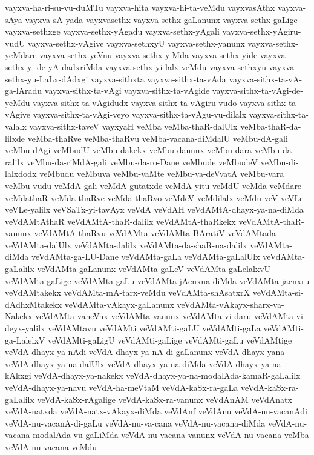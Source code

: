 {vayxva-ha-ri-su-vu-duMTu
vayxva-hita
vayxva-hi-ta-veMdu
vayxvasAthx
vayxva-sAya
vayxva-sA-yada
vayxvasethx
vayxva-sethx-gaLanunx
vayxva-sethx-gaLige
vayxva-sethxge
vayxva-sethx-yAgadu
vayxva-sethx-yAgali
vayxva-sethx-yAgiru-vudU
vayxva-sethx-yAgive
vayxva-sethxyU
vayxva-sethx-yanunx
vayxva-sethx-yeMdare
vayxva-sethx-yeVnu
vayxva-sethx-yiMda
vayxva-sethx-yide
vayxva-sethx-yi-de-yA-dadxriMda
vayxva-sethx-yi-lalx-veMdu
vayxva-sethxyu
vayxva-sethx-yu-LaLx-dAdxgi
vayxva-sithxta
vayxva-sithx-ta-vAda
vayxva-sithx-ta-vA-ga-lAradu
vayxva-sithx-ta-vAgi
vayxva-sithx-ta-vAgide
vayxva-sithx-ta-vAgi-de-yeMdu
vayxva-sithx-ta-vAgidudx
vayxva-sithx-ta-vAgiru-vudo
vayxva-sithx-ta-vAgive
vayxva-sithx-ta-vAgi-veyo
vayxva-sithx-ta-vAgu-vu-dilalx
vayxva-sithx-ta-valalx
vayxva-sithx-taveV
vayxyaH
veMba
veMba-thaR-dalUlx
veMba-thaR-da-lilxde
veMba-thaRve
veMba-thaRvu
veMba-vacana-diMdalU
veMbu-dA-gali
veMbu-dAgi
veMbudU
veMbu-dakekx
veMbu-danunx
veMbu-dara
veMbu-da-ralilx
veMbu-da-riMdA-gali
veMbu-da-ro-Dane
veMbude
veMbudeV
veMbu-di-lalxdodx
veMbudu
veMbuva
veMbu-vaMte
veMbu-va-deVvatA
veMbu-vara
veMbu-vudu
veMdA-gali
veMdA-gutatxde
veMdA-yitu
veMdU
veMda
veMdare
veMdathaR
veMda-thaRve
veMda-thaRvo
veMdeV
veMdilalx
veMdu
veV
veVLe
veVLe-yalilx
veVSaTx-yi-tavAyx
veVdA
veVdAH
veVdAMtA-dhayx-ya-na-diMda
veVdAMtAthaR
veVdAMtA-thaR-dalilx
veVdAMtA-thaRkekx
veVdAMtA-thaR-vanunx
veVdAMtA-thaRvu
veVdAMta
veVdAMta-BAratiV
veVdAMtada
veVdAMta-dalUlx
veVdAMta-dalilx
veVdAMta-da-shaR-na-dalilx
veVdAMta-diMda
veVdAMta-ga-LU-Dane
veVdAMta-gaLa
veVdAMta-gaLalUlx
veVdAMta-gaLalilx
veVdAMta-gaLanunx
veVdAMta-gaLeV
veVdAMta-gaLelalxvU
veVdAMta-gaLige
veVdAMta-gaLu
veVdAMta-jAcnxna-diMda
veVdAMta-jacnxru
veVdAMtakekx
veVdAMta-mA-tarx-veMdu
veVdAMta-shAsatxrX
veVdAMta-si-dAdhxMtakekx
veVdAMta-vAkayx-gaLanunx
veVdAMta-vAkayx-sharx-va-Nakekx
veVdAMta-vaneVnx
veVdAMta-vanunx
veVdAMta-vi-daru
veVdAMta-vi-deyx-yalilx
veVdAMtavu
veVdAMti
veVdAMti-gaLU
veVdAMti-gaLa
veVdAMti-ga-LalelxV
veVdAMti-gaLigU
veVdAMti-gaLige
veVdAMti-gaLu
veVdAMtige
veVdA-dhayx-ya-nAdi
veVdA-dhayx-ya-nA-di-gaLanunx
veVdA-dhayx-yana
veVdA-dhayx-ya-na-dalUlx
veVdA-dhayx-ya-na-diMda
veVdA-dhayx-ya-na-kAkxgi
veVdA-dhayx-ya-nakekx
veVdA-dhayx-ya-na-modalAda-kamaR-gaLalilx
veVdA-dhayx-ya-navu
veVdA-ha-meVtaM
veVdA-kaSx-ra-gaLa
veVdA-kaSx-ra-gaLalilx
veVdA-kaSx-rAgalige
veVdA-kaSx-ra-vanunx
veVdAnAM
veVdAnatx
veVdA-natxda
veVdA-natx-vAkayx-diMda
veVdAnf
veVdAnu
veVdA-nu-vacanAdi
veVdA-nu-vacanA-di-gaLu
veVdA-nu-va-cana
veVdA-nu-vacana-diMda
veVdA-nu-vacana-modalAda-vu-gaLiMda
veVdA-nu-vacana-vanunx
veVdA-nu-vacana-veMba
veVdA-nu-vacana-veMdu
}
